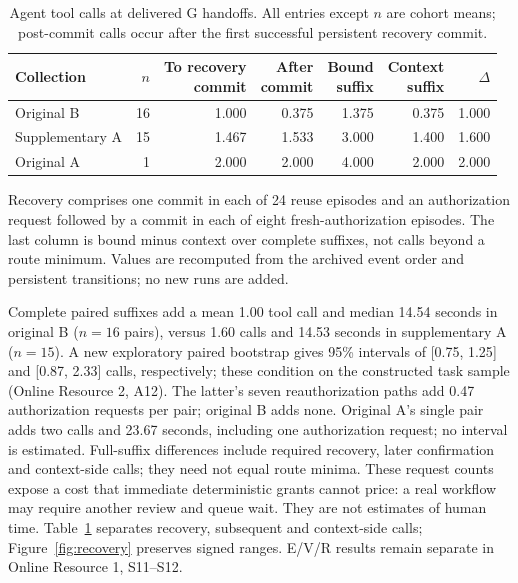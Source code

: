 \documentclass[pdflatex,sn-basic]{sn-jnl}
\begin{document}
\begin{table}[t]
\caption{Agent tool calls at delivered G handoffs. All entries except $n$ are cohort means; post-commit calls occur after the first successful persistent recovery commit.}\label{tab:recovery-decomposition}
\centering\small
\setlength{\tabcolsep}{3pt}
\begin{tabular*}{\textwidth}{@{\extracolsep{\fill}}lrrrrrr@{}}
\toprule
Collection & $n$ & \shortstack{To recovery\\commit} & \shortstack{After\\commit} & \shortstack{Bound\\suffix} & \shortstack{Context\\suffix} & $\Delta$ \\
\midrule
Original B & 16 & 1.000 & 0.375 & 1.375 & 0.375 & 1.000 \\
Supplementary A & 15 & 1.467 & 1.533 & 3.000 & 1.400 & 1.600 \\
Original A & 1 & 2.000 & 2.000 & 4.000 & 2.000 & 2.000 \\
\bottomrule
\end{tabular*}
\par\smallskip\begin{minipage}{\textwidth}\small Recovery comprises one commit in each of 24 reuse episodes and an authorization request followed by a commit in each of eight fresh-authorization episodes. The last column is bound minus context over complete suffixes, not calls beyond a route minimum. Values are recomputed from the archived event order and persistent transitions; no new runs are added.\end{minipage}
\end{table}

Complete paired suffixes add a mean 1.00 tool call and median 14.54 seconds in original B ($n=16$ pairs), versus 1.60 calls and 14.53 seconds in supplementary A ($n=15$). A new exploratory paired bootstrap gives 95\% intervals of {[}0.75, 1.25{]} and {[}0.87, 2.33{]} calls, respectively; these condition on the constructed task sample (Online Resource 2, A12). The latter's seven reauthorization paths add 0.47 authorization requests per pair; original B adds none. Original A's single pair adds two calls and 23.67 seconds, including one authorization request; no interval is estimated. Full-suffix differences include required recovery, later confirmation and context-side calls; they need not equal route minima. These request counts expose a cost that immediate deterministic grants cannot price: a real workflow may require another review and queue wait. They are not estimates of human time. Table~\ref{tab:recovery-decomposition} separates recovery, subsequent and context-side calls; Figure~\ref{fig:recovery} preserves signed ranges. E/V/R results remain separate in Online Resource 1, S11--S12.
\end{document}
